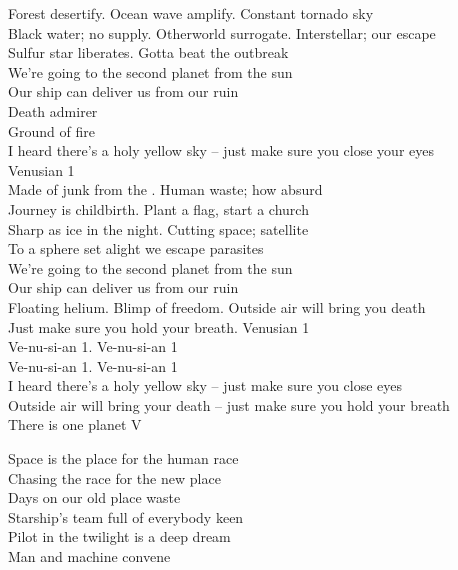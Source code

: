 Forest desertify. Ocean wave amplify. Constant tornado sky \\
Black water; no supply. Otherworld surrogate. Interstellar; our escape \\
Sulfur star liberates. Gotta beat the outbreak \\

We're going to the second planet from the sun \\
Our ship can deliver us from our ruin \\

Death admirer \\
Ground of fire \\
I heard there's a holy yellow sky -- just make sure you close your eyes \\
Venusian 1 \\

Made of junk from the . Human waste; how absurd \\
Journey is childbirth. Plant a flag, start a church \\
Sharp as ice in the night. Cutting space; satellite \\
To a sphere set alight we escape parasites \\

We're going to the second planet from the sun \\
Our ship can deliver us from our ruin \\

Floating helium. Blimp of freedom. Outside air will bring you death \\
Just make sure you hold your breath. Venusian 1 \\

Ve-nu-si-an 1. Ve-nu-si-an 1 \\
Ve-nu-si-an 1. Ve-nu-si-an 1 \\

I heard there's a holy yellow sky -- just make sure you close eyes \\
Outside air will bring your death -- just make sure you hold your breath \\

There is one planet V \\




Space is the place for the human race \\
Chasing the race for the new place \\
Days on our old place waste \\
Starship's team full of everybody keen \\
Pilot in the twilight is a deep dream \\
Man and machine convene \\

